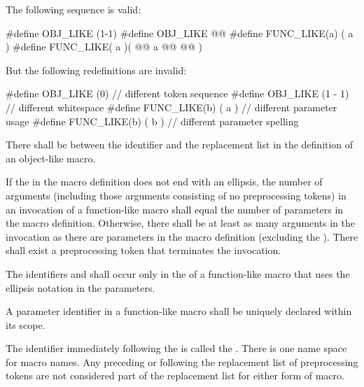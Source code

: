 \documentclass{wg21}
\newcommand{\cwhitespaces}[1]{\removed{#1} \added{\grammarterm{whitespace}{s}}}
\begin{document}
\pnum
\begin{example}
    The following sequence is valid:
    \begin{codeblock}
        #define OBJ_LIKE      (1-1)
        #define OBJ_LIKE      @@
        #define FUNC_LIKE(a)   ( a )
        #define FUNC_LIKE( a )(     @@
        a @@
        @\tcode{*/}@ )
    \end{codeblock}
    But the following redefinitions are invalid:
    \begin{codeblock}
        #define OBJ_LIKE    (0)         // different token sequence
        #define OBJ_LIKE    (1 - 1)     // different whitespace
        #define FUNC_LIKE(b) ( a )      // different parameter usage
        #define FUNC_LIKE(b) ( b )      // different parameter spelling
    \end{codeblock}
\end{example}

\pnum
{}%
There shall be  between the identifier and the replacement list in the definition of an object-like macro.

\pnum
If the  in the macro definition does not end with
an ellipsis, the number of arguments (including those arguments consisting
of no preprocessing tokens)
in an invocation of a function-like macro shall
equal the number of parameters in the macro definition.
Otherwise, there shall be at least as many arguments in the invocation as there are
parameters in the macro definition (excluding the ). There
shall exist a
\tcode{)}
preprocessing token that terminates the invocation.

\pnum
{}%
%
The identifiers  and 
shall occur only in the 
of a function-like macro that uses the ellipsis notation in the parameters.

\pnum
A parameter identifier in a function-like macro
shall be uniquely declared within its scope.

\pnum
The identifier immediately following the
is called the
%
.
There is one name space for macro names.
Any \cwhitespaces{whitespace characters} preceding or following the
replacement list of preprocessing tokens are not considered
part of the replacement list for either form of macro.
\end{document}
